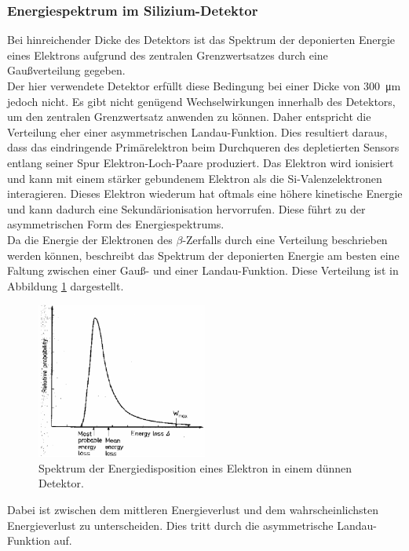 \subsubsection{Energiespektrum im Silizium-Detektor}
Bei hinreichender Dicke des Detektors ist das Spektrum der deponierten Energie eines Elektrons aufgrund des zentralen Grenzwertsatzes durch eine Gaußverteilung gegeben.\\
Der hier verwendete Detektor erfüllt diese Bedingung bei einer Dicke von
\SI{300}{\micro\meter} jedoch nicht. Es gibt nicht genügend Wechselwirkungen
innerhalb des Detektors, um den zentralen Grenzwertsatz anwenden zu können.
Daher entspricht die Verteilung eher einer asymmetrischen Landau-Funktion.
Dies resultiert daraus, dass das eindringende Primärelektron beim Durchqueren des depletierten Sensors entlang seiner Spur Elektron-Loch-Paare produziert. Das Elektron wird ionisiert und kann mit einem stärker gebundenem Elektron als die Si-Valenzelektronen interagieren. Dieses Elektron wiederum hat oftmals eine höhere kinetische Energie und kann dadurch eine Sekundärionisation hervorrufen. Diese führt zu der asymmetrischen Form des Energiespektrums.\\
Da die Energie der Elektronen des $\beta$-Zerfalls durch eine Verteilung beschrieben werden können, beschreibt das Spektrum der deponierten Energie am besten eine Faltung zwischen einer Gauß- und einer Landau-Funktion. Diese Verteilung ist in Abbildung \ref{fig:faltung} dargestellt.
\begin{figure}[htb]
  \centering
  \includegraphics[width=0.5\textwidth]{graphics/Landau.pdf}
  \caption{Spektrum der Energiedisposition eines Elektron in einem dünnen Detektor. \cite{anleitung}}
  \label{fig:faltung}
\end{figure}
Dabei ist zwischen dem mittleren Energieverlust und dem wahrscheinlichsten Energieverlust zu unterscheiden. Dies tritt durch die asymmetrische Landau-Funktion auf.

